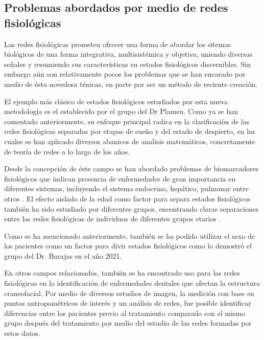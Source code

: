 \documentclass[twoside,twocolumn]{article}
\begin{document}
\subsection{Problemas abordados por medio de redes fisiológicas}
Las redes fisiológicas prometen ofrecer una forma de abordar los sitemas biológicos de una forma integrativa, multisistémica y objetiva, uniendo diversas señales y resumiendo sus características en estados fisiológicos discernibles\cite{ivanov2016focus}.
Sin embargo aún son relativamente pocos los problemas que se han encarado por medio de ésta novedosa ténicas, en parte por ser un método de reciente creación.

El ejemplo más clásico de estados fisiológicos estudiados por esta nueva metodología es el establecido por el grupo del Dr Plamen.
Como ya se han comentado anteriormente, su enfoque principal radica en la clasificación de las redes fisiológicas separadas por etapas de sueño y del estado de despierto, en las cuales se han aplicado diversos abanicos de analisis matemáticos, concretamente de teoría de redes a lo largo de los años\cite{bashan2012network}\cite{lin2020dynamic}.

Desde la concepción de éste campo se han abordado problemas de biomarcadores fisiológicos que indican presencia de enfermedades de gran importancia en diferentes sistemas, incluyendo el sistema endocrino, hepático, pulmonar entre otros \cite{barajas2021physiological}.
El efecto aislado de la edad como factor para separa estados fisiológicos también ha sido estudiado por diferentes grupos, encontrando claras separaciones entre las redes fisiológicas de individuos de diferentes grupos etarios \cite{easton2020metabolic}\cite{chmiel2014spreading}.

Como se ha mencionado anteriormente, también se ha podido utilizar el sexo de los pacientes como un factor para divir estados fisiológicos como lo demostró el grupo del Dr. Barajas en el año 2021\cite{barajas2021sex}.

En otros campos relacionados, también se ha encontrado uso para las redes fisiológicas en la identificación de enfermedades dentales que afectan la estructura craneofacial\cites{scala2014complex}.
Por medio de diversos estudios de imagen, la medición con base en puntos antropométricos de interés y un análisis de redes, fue posible identificar diferencias entre los pacientes previo al tratamiento comparado con el mismo grupo después del tratamiento por medio del estudio de las redes formadas por estos datos.
\end{document}
